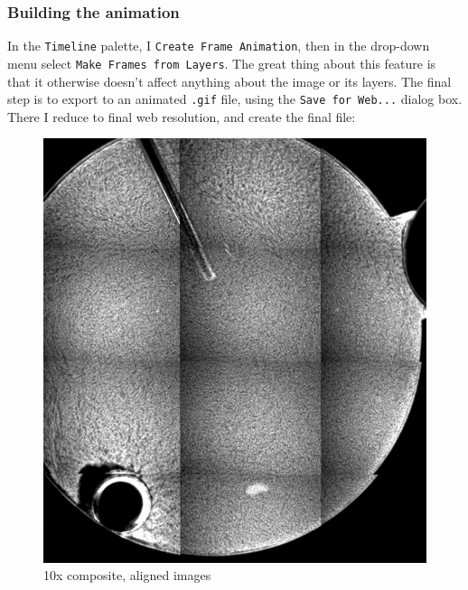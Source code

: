 \subsubsection{Building the
animation}\hypertarget{building-the-animation}{}\label{building-the-animation} In the {\tt Timeline} palette, I {\tt Create Frame Animation}, then in the
drop-down menu select {\tt Make Frames from Layers}. The great thing about this
feature is that it otherwise doesn't affect anything about the image or its
layers. The final step is to export to an animated {\tt .gif} file, using the
{\tt Save for Web...} dialog box. There I reduce to final web resolution, and
create the final file:
\begin{figure}[h]
\begin{center}
\includegraphics[width=\columnwidth]{./images/2014_07_27_ace_m2_run4_s22_gel/w9s22_10x_days02to15.png}
\end{center}
\caption{10x composite, aligned images}
\end{figure}

\clearpage

